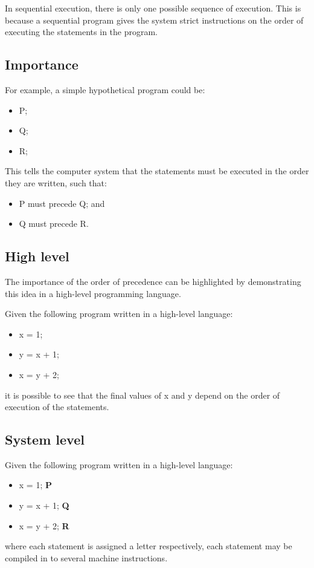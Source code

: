 \documentclass[a4paper]{systems-software}
\begin{document}
In sequential execution, there is only one possible sequence of execution. This is because a sequential program gives the system strict instructions on the order of executing the statements in the program.


\subsection*{Importance}

For example, a simple hypothetical program could be:
\begin{itemize}
	\item[] P;
	\item[] Q;
	\item[] R;
\end{itemize}

This tells the computer system that the statements must be executed in the order they are written, such that:
\begin{itemize}
	\item P must precede Q; and
	\item Q must precede R.
\end{itemize}


\subsection*{High level}

The importance of the order of precedence can be highlighted by demonstrating this idea in a high-level programming language.

Given the following program written in a high-level language:
\begin{itemize}
	\item[] x = 1;
	\item[] y = x + 1;
	\item[] x = y + 2;
\end{itemize}
it is possible to see that the final values of x and y depend on the order of execution of the statements.


\subsection*{System level}

Given the following program written in a high-level language:
\begin{itemize}
	\item[] x = 1; \textbf{P}
	\item[] y = x + 1; \textbf{Q}
	\item[] x = y + 2; \textbf{R}
\end{itemize}
where each statement is assigned a letter respectively, each statement may be compiled in to several machine instructions.
\end{document}

